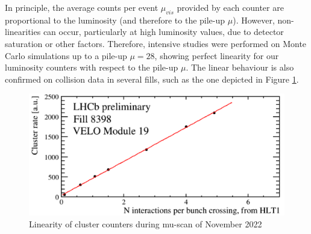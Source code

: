 %
%
In principle, the average counts per event $\mu_{vis}$ provided by each counter are proportional to the luminosity (and therefore to the pile-up $\mu$). However, non-linearities can occur, particularly at high luminosity values, due to detector saturation or other factors. Therefore, intensive studies were performed on Monte Carlo simulations up to a pile-up $\mu = 28$, showing perfect linearity for our luminosity counters\cite{dan} with respect to the pile-up $\mu$. The linear behaviour is also confirmed on collision data in several fills, such as the one depicted in Figure \ref{fig:muscan}.

\begin{figure}
    \centering
    \includegraphics[width=\textwidth]{figures/muscan.png}
    \caption{Linearity of cluster counters during mu-scan of November 2022}
    \label{fig:muscan}
\end{figure}


